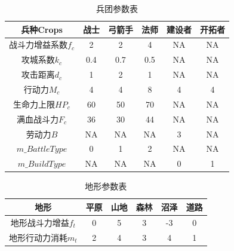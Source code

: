 \documentclass[a4paper,4pt]{article}
\begin{document}
\begin{table}[htbp]
  \centering
  \caption{兵团参数表}
  \begin{tabular}{c|c|c|c|c|c}
    \hline
    兵种Crops           & 战士 & 弓箭手 & 法师 & 建设者 & 开拓者 \bigstrut \\
    \hline
    战斗力增益系数$f_c$ & 2    & 2      & 4    & NA     & NA \bigstrut     \\
    \hline
    攻城系数$k_c$       & 0.4  & 0.7    & 0.5  & NA     & NA \bigstrut     \\
    \hline
    攻击距离$d_c$       & 1    & 2      & 1    & NA     & NA \bigstrut     \\
    \hline
    行动力$M_c$         & 4    & 4      & 8    & 4      & 4 \bigstrut      \\
    \hline
    生命力上限$HP_c$    & 60   & 50     & 70   & NA     & NA \bigstrut     \\
    \hline
    满血战斗力$F_c$     & 36   & 30     & 44   & NA     & NA \bigstrut     \\
    \hline
    劳动力$B$           & NA   & NA     & NA   & 3      & NA \bigstrut     \\
    \hline
    $m\_BattleType$     & 0    & 1      & 2    & NA     & NA \bigstrut     \\
    \hline
    $m\_BuildType$      & NA   & NA     & NA   & 0      & 1 \bigstrut      \\
    \hline
  \end{tabular}%
  \label{兵团}%
\end{table}%

\begin{table}[htbp]
  \centering
  \caption{地形参数表}
  \begin{tabular}{c|c|c|c|c|c}
    \hline
    地形                & 平原 & 山地 & 森林 & 沼泽 & 道路 \bigstrut \\
    \hline
    地形战斗力增益$f_t$ & 0    & 5    & 3    & -3   & 0 \bigstrut    \\
    \hline
    地形行动力消耗$m_t$ & 2    & 4    & 3    & 4    & 1 \bigstrut    \\
    \hline
  \end{tabular}%
  \label{地形}%
\end{table}%
\end{document}
